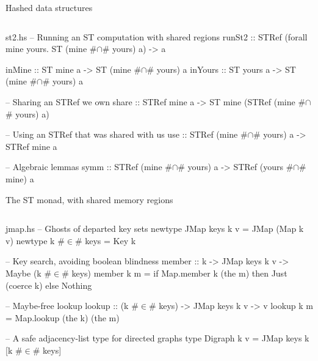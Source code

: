 \documentclass{beamer}
\begin{document}
\begin{frame}{Hashed data structures}
\inputminted{haskell}{hashes.hs}
\end{frame}

\begin{filecontents*}{st2.hs}
-- Running an ST computation with shared regions
runSt2  ::
  STRef (forall mine yours. ST (mine #$\cap$# yours) a) -> a

inMine  :: ST mine  a -> ST (mine #$\cap$# yours) a
inYours :: ST yours a -> ST (mine #$\cap$# yours) a

-- Sharing an STRef we own
share  :: STRef mine a -> ST mine (STRef (mine #$\cap$# yours) a)

-- Using an STRef that was shared with us
use    :: STRef (mine #$\cap$# yours) a -> STRef mine a

-- Algebraic lemmas
symm   :: STRef (mine #$\cap$# yours) a -> STRef (yours #$\cap$# mine) a

\end{filecontents*}

\begin{frame}{}\end{frame}

\usebackgroundtemplate{}
\begin{frame}{The ST monad, with shared memory regions}
  \inputminted{haskell}{st2.hs}
\end{frame}

\begin{filecontents*}{jmap.hs}
-- Ghosts of departed key sets
newtype JMap keys k v = JMap (Map k v)
newtype k #$\in$# keys      = Key k

-- Key search, avoiding boolean blindness
member :: k -> JMap keys k v -> Maybe (k #$\in$# keys)
member k m = if Map.member k (the m)
               then Just (coerce k)
               else Nothing
               
-- Maybe-free lookup
lookup :: (k #$\in$# keys) -> JMap keys k v -> v
lookup k m = Map.lookup (the k) (the m)

-- A safe adjacency-list type for directed graphs
type Digraph k v = JMap keys k [k #$\in$# keys]
\end{filecontents*}
\end{document}
